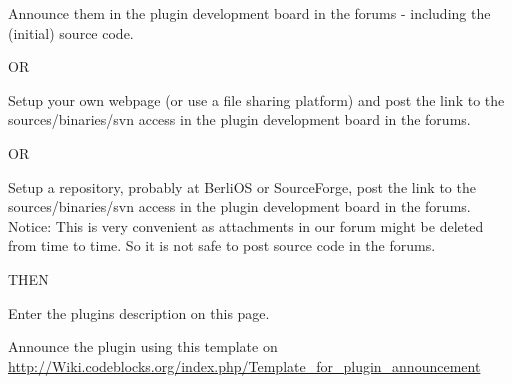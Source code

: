 \tab Announce them in the plugin development board in the forums - including the (initial) source code.

OR

\tab Setup your own webpage (or use a file sharing platform) and post the link to the sources/binaries/svn access in the plugin development board in the forums.

OR

\tab Setup a repository, probably at BerliOS or SourceForge, post the link to the sources/binaries/svn access in the plugin development board in the forums. Notice: This is very convenient as attachments in our forum might be deleted from time to time. So it is not safe to post source code in the forums.

THEN

\tab Enter the plugins description on this page.

\tab Announce the plugin using this template on \url{http://Wiki.codeblocks.org/index.php/Template_for_plugin_announcement}

\begin{ASTYLE}

\end{ASTYLE}

\begin{AUTOVERSIONING}

\end{AUTOVERSIONING}

\begin{BROWSETRACKS}

\end{BROWSETRACKS}

\begin{CODESNIPPETS}

\end{CODESNIPPETS}

\begin{CODECOMPLETION}

\end{CODECOMPLETION}

\begin{DOXYBLOCKS}

\end{DOXYBLOCKS}

\begin{EDITORTWEAKS}

\end{EDITORTWEAKS}

\begin{ENVVAR}

\end{ENVVAR}

\begin{FILEMANAGER}

\end{FILEMANAGER}

